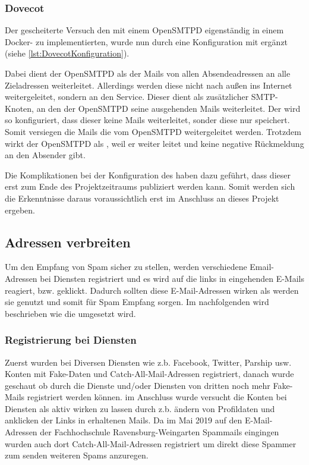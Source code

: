 \documentclass[a4paper,11pt,singlespacing]{article}
\begin{document}
		\subsubsection{Dovecot}\label{OpenRelayDovecot}
			Der gescheiterte Versuch den  mit einem \textsf{OpenSMTPD} eigenständig in einem Docker- zu implementierten, wurde nun durch eine Konfiguration mit  ergänzt (siehe \autoref{lst:DovecotKonfiguration}).
			
			Dabei dient der \textsf{OpenSMTPD} als  der Mails von allen Absendeadressen an alle Zieladressen weiterleitet. Allerdings werden diese nicht nach au{\ss}en ins Internet weitergeleitet, sondern an den  Service. Dieser dient als zusätzlicher SMTP-Knoten, an den der \textsf{OpenSMTPD} seine ausgehenden Mails weiterleitet. Der  wird so konfiguriert, dass dieser keine Mails weiterleitet, sonder diese nur speichert. Somit versiegen die Mails die vom \textsf{OpenSMTPD} weitergeleitet werden. Trotzdem wirkt der \textsf{OpenSMTPD} als , weil er weiter leitet und keine negative Rückmeldung an den Absender gibt.
			
			Die Komplikationen bei der Konfiguration des  haben dazu geführt, dass dieser erst zum Ende des Projektzeitraums publiziert werden kann. Somit werden sich die Erkenntnisse daraus voraussichtlich erst im Anschluss an dieses Projekt ergeben.


	\subsection{Adressen verbreiten}\label{sec:UmsetzungAdressenverbreiten}
		Um den Empfang von Spam sicher zu stellen, werden verschiedene Email-Adressen bei Diensten registriert und es wird auf die links in eingehenden E-Mails reagiert, bzw. geklickt. Dadurch sollten diese E-Mail-Adressen wirken als werden sie genutzt und somit für Spam Empfang sorgen. Im nachfolgenden wird beschrieben wie die umgesetzt wird.

		\subsubsection{Registrierung bei Diensten}\label{AdressenVerbreitenRegistrierenDiensten}
		Zuerst wurden bei Diversen Diensten wie z.b. Facebook, Twitter, Parship usw. Konten mit Fake-Daten und Catch-All-Mail-Adressen registriert, danach wurde geschaut ob durch die Dienste und/oder Diensten von dritten noch mehr Fake-Mails registriert werden können. im Anschluss wurde versucht die Konten bei Diensten als aktiv wirken zu lassen durch z.b. ändern von Profildaten und anklicken der Links in erhaltenen Mails. Da im Mai 2019 auf den E-Mail-Adressen der Fachhochschule Ravensburg-Weingarten Spammails eingingen wurden auch dort Catch-All-Mail-Adressen registriert um direkt diese Spammer zum senden weiteren Spams anzuregen.
		
\end{document}
